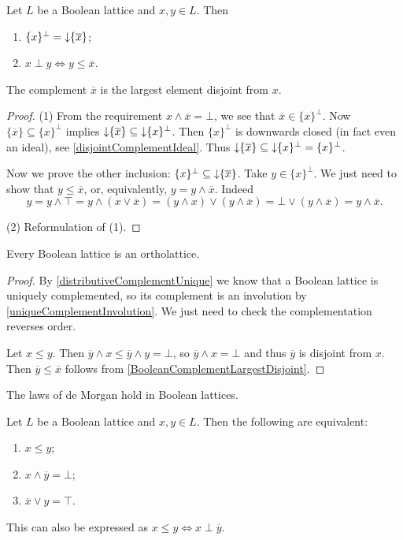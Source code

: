 \begin{lemma} \label{BooleanComplementLargestDisjoint}
Let $L$ be a Boolean lattice and $x,y\in L$. Then
\begin{enumerate}
\item $\{x\}^\perp = \operatorname{\downarrow} \{\overline{x}\}$;
\item $x\perp y \iff y\leq \overline{x}$.
\end{enumerate}
\end{lemma}
The complement $\overline{x}$ is the largest element disjoint from $x$.
\begin{proof}
(1) From the requirement $x\wedge \overline{x} = \bot$, we see that $\overline{x}\in \{x\}^\perp$. Now $\{\overline{x}\} \subseteq \{x\}^\perp$ implies $\operatorname{\downarrow} \{\overline{x}\} \subseteq \operatorname{\downarrow}\{x\}^\perp$. Then $\{x\}^\perp$ is downwards closed (in fact even an ideal), see \ref{disjointComplementIdeal}. Thus $\operatorname{\downarrow} \{\overline{x}\} \subseteq \operatorname{\downarrow}\{x\}^\perp = \{x\}^\perp$.

Now we prove the other inclusion: $\{x\}^\perp \subseteq \operatorname{\downarrow} \{\overline{x}\}$.
Take $y\in \{x\}^\perp$. We just need to show that $y\leq \overline{x}$, or, equivalently, $y = y\wedge \overline{x}$. Indeed
\[ y = y \wedge \top = y\wedge (x\vee \overline{x}) = (y\wedge x)\vee (y\wedge \overline{x}) = \bot \vee (y\wedge \overline{x}) = y\wedge \overline{x}. \]

(2) Reformulation of (1).
\end{proof}
\begin{corollary}
Every Boolean lattice is an ortholattice.
\end{corollary}
\begin{proof}
By \ref{distributiveComplementUnique} we know that a Boolean lattice is uniquely complemented, so its complement is an involution by \ref{uniqueComplementInvolution}. We just need to check the complementation reverses order.

Let $x\leq y$. Then $\overline{y} \wedge x \leq \overline{y} \wedge y = \bot$, so $\overline{y} \wedge x = \bot$ and thus $\overline{y}$ is disjoint from $x$. Then $\overline{y} \leq \overline{x}$ follows from \ref{BooleanComplementLargestDisjoint}.
\end{proof}
\begin{corollary}
The laws of de Morgan hold in Boolean lattices.
\end{corollary}
\begin{corollary} \label{BooleanInequalities}
Let $L$ be a Boolean lattice and $x,y\in L$. Then the following are equivalent:
\begin{enumerate}
\item $x \leq y$;
\item $x\wedge \overline{y} = \bot$;
\item $\overline{x} \vee y = \top$.
\end{enumerate}
This can also be expressed as $x\leq y \iff x\perp \overline{y}$.
\end{corollary}
